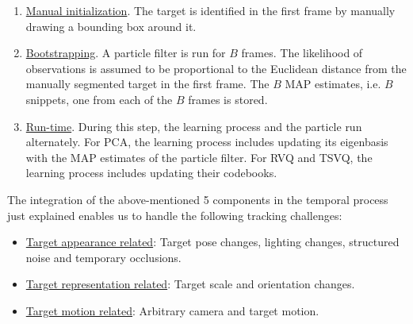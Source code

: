 \begin{enumerate}
\item \underline{Manual initialization}.  The target is identified in the first frame by manually drawing a bounding box around it.


\item \underline{Bootstrapping}.  A particle filter is run for $B$ frames.  The likelihood of observations is assumed to be proportional to the Euclidean distance from the manually segmented target in the first frame.  The $B$ MAP estimates, i.e. $B$ snippets, one from each of the $B$ frames is stored.

  \item \underline{Run-time}.  During this step, the learning process and the particle run alternately.  For PCA, the learning process includes updating its eigenbasis with the MAP estimates of the particle filter.  For RVQ and TSVQ, the learning process includes updating their codebooks. 
\end{enumerate}



The integration of the above-mentioned 5 components in the temporal process just explained enables us to handle the following tracking challenges:

\begin{itemize}
\item \underline{Target appearance related}: Target pose changes, lighting changes, structured noise and temporary occlusions.
\item  \underline{Target representation related}: Target scale and orientation changes.
\item  \underline{Target motion related}: Arbitrary camera and target motion.
\end{itemize}

